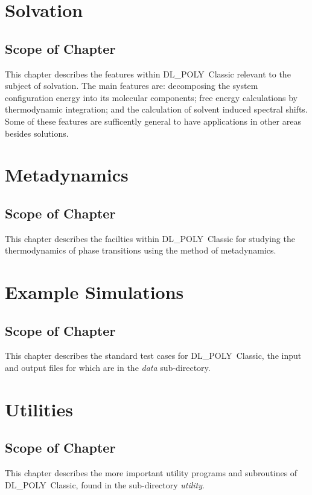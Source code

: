 \documentclass[11pt,a4paper,dvipdfm]{report}
\newcommand{\D}{\mbox{DL\_POLY Classic}}
\begin{document}
\chapter{Solvation}
\label{solvation}
\setcounter{equation}{0}
\newpage
\section*{Scope of Chapter}
This chapter describes the features within \D{} relevant to the subject of
solvation.  The main features are: decomposing the system configuration energy
into its molecular components; free energy calculations by thermodynamic
integration; and the calculation of solvent induced spectral shifts.  Some of
these features are sufficently general to have applications in other areas
besides solutions.  \newpage  \newpage

\chapter{Metadynamics}
\label{metadynamics}
\setcounter{equation}{0}
\newpage
\section*{Scope of Chapter}
This chapter describes the facilties within \D{} for studying the 
thermodynamics of phase transitions using the method of metadynamics.
\newpage

\newpage

\chapter{Example Simulations}
\label{data}
\setcounter{equation}{0}
\newpage
\section*{Scope of Chapter}
This chapter describes the standard test cases for \D{}, the input
and output files for which are in the {\em data} sub-directory.
\newpage


\chapter{Utilities}
\label{utility}
\setcounter{equation}{0}
\newpage
\section*{Scope of Chapter}
This chapter describes the more important utility programs and
subroutines of \D{}, found in the sub-directory {\em utility}. 
\end{document}
